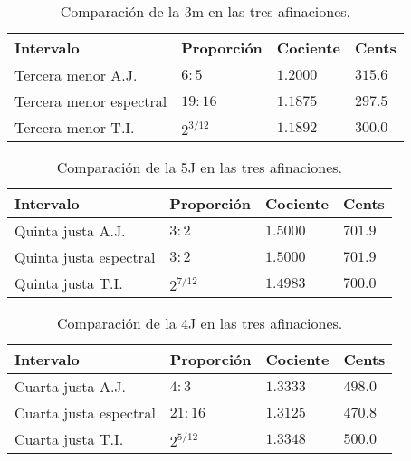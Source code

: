 \documentclass[a4paper,12pt]{article}
\begin{document}
  \begin{table}[ht]
  \centering
  \caption{Comparación de la 3m en las tres afinaciones.}\label{tab:3m}
  \begin{tabular}{@{}llll@{}}
  \toprule
  Intervalo               & Proporción  & Cociente & Cents   \\ \midrule
  Tercera menor A.J.      & $6:5$       & $1.2000$ & $315.6$ \\
  Tercera menor espectral & $19:16$     & $1.1875$ & $297.5$ \\
  Tercera menor T.I.      & $2^{3/12}$  & $1.1892$ & $300.0$ \\ \bottomrule
  \end{tabular}
  \end{table}

  \begin{table}[ht]
  \centering
  \caption{Comparación de la 5J en las tres afinaciones.}\label{tab:5J}
  \begin{tabular}{llll}
  \hline
  Intervalo               & Proporción  & Cociente & Cents   \\ \hline
  Quinta justa A.J.       & $3:2$       & $1.5000$ & $701.9$ \\
  Quinta justa espectral  & $3:2$       & $1.5000$ & $701.9$ \\
  Quinta justa T.I.       & $2^{7/12}$  & $1.4983$ & $700.0$ \\ \bottomrule
  \end{tabular}
  \end{table}

  \begin{table}[ht]
  \centering
  \caption{Comparación de la 4J en las tres afinaciones.}\label{tab:4J}
  \begin{tabular}{llll}
  \hline
  Intervalo               & Proporción & Cociente & Cents    \\ \hline
  Cuarta justa A.J.       & $4:3$      & $1.3333$ & $498.0$  \\
  Cuarta justa espectral  & $21:16$    & $1.3125$ & $470.8$  \\
  Cuarta justa T.I.       & $2^{5/12}$ & $1.3348$ & $500.0$  \\ \bottomrule
  \end{tabular}
  \end{table}
\end{document}
